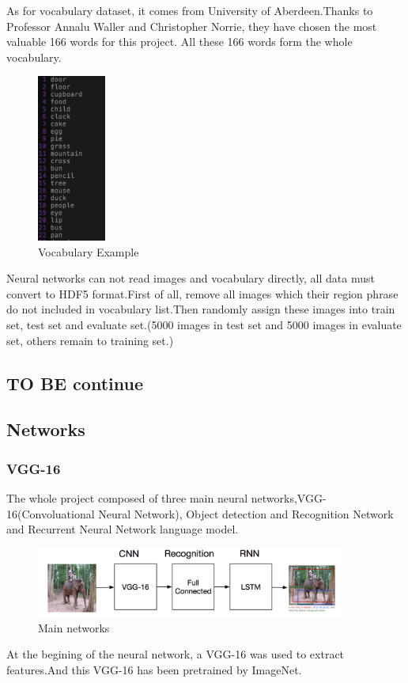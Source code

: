 \documentclass[12pt,a4paper]{report}
\begin{document}
As for vocabulary dataset, it comes from University of Aberdeen.Thanks to Professor Annalu Waller and Christopher Norrie, they have chosen the most valuable 166  words for this project. All these 166 words form the whole vocabulary.

\begin{figure}[h]
\centering
\includegraphics[width=0.2\textwidth]{vocab.png}
\caption{Vocabulary Example}
\end{figure}

Neural networks can not read images and vocabulary directly, all data must convert to HDF5 format.First of all, remove all images which their region phrase do not included in vocabulary list.Then randomly assign these images into train set, test set and evaluate set.(5000 images in test set and 5000 images in evaluate set, others remain to training set.)
\subsection{TO BE continue}


\newpage
\subsection{Networks}
\subsubsection{VGG-16}
The whole project composed of three main neural networks,VGG-16(Convoluational Neural Network), Object detection and Recognition Network  and Recurrent Neural Network language model.

\begin{figure}[h]
\centering
\includegraphics[width=0.9\textwidth]{network.png}
\caption{Main networks}
\end{figure}
At the begining of the neural network, a VGG-16 was used to extract features.And this VGG-16 has been pretrained by ImageNet.\\
\end{document}

